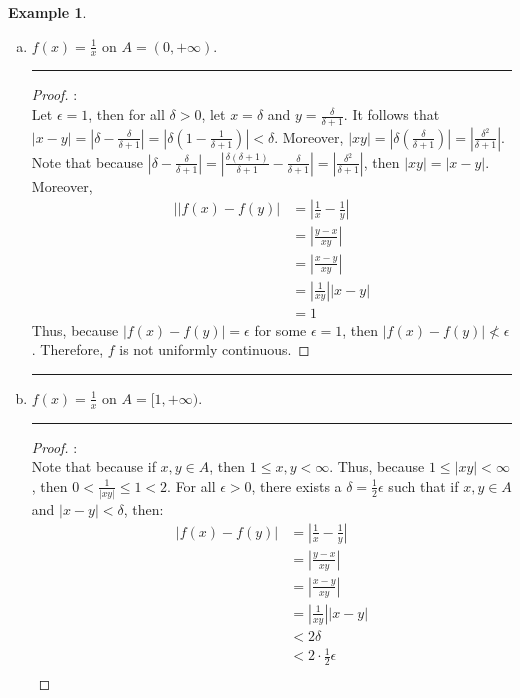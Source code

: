 \documentclass[openany, amssymb, psamsfonts]{amsart}
\theoremstyle{definition}
\newtheorem{exmp}{Example}[section]
\numberwithin{equation}{section}
\begin{document}
\begin{exmp}
\begin{enumerate}[(a)]
		\item $f(x) = \frac{1}{x}$ on $A = (0, + \infty)$.
\vspace{4pt}     \hrule   \vspace{4pt} \begin{proof}:\\
Let $\epsilon=1$, then for all $\delta >0$, let $x = \delta$ and $y = \frac{\delta}{\delta+1}$. It follows that $|x-y| = |\delta - \frac{\delta}{\delta+1}| = |\delta(1-\frac{1}{\delta+1})|<\delta$. Moreover, $|xy| = |\delta(\frac{\delta}{\delta+1})| = |\frac{\delta^2}{\delta+1}|$. Note that because $|\delta-\frac{\delta}{\delta+1}| = |\frac{\delta(\delta+1)}{\delta+1} - \frac{\delta}{\delta+1}| = |\frac{\delta^2}{\delta +1}|$, then $|xy| = |x-y|$. Moreover,
\begin{align*}
||f(x) - f(y)| &= |\frac{1}{x} - \frac{1}{y}|\\
                & = |\frac{y-x}{xy}|\\
                &= |\frac{x-y}{xy}|\\
                &= |\frac{1}{xy}||x-y|\\
\tag{since $|xy| = |x-y|$}                &= 1
\end{align*}
Thus, because $|f(x) - f(y)| = \epsilon$ for some $\epsilon =1$, then $|f(x) - f(y)|\not < \epsilon$. Therefore, $f$ is not uniformly continuous. 
\end{proof} \vspace{4pt}     \hrule   \vspace{4pt}
		\item $f(x) = \frac{1}{x}$ on $A = [1, + \infty)$.
\vspace{4pt}     \hrule   \vspace{4pt} \begin{proof}:\\
Note that because if $x,y \in A$, then $1\leq x,y<\infty$. Thus, because $1\leq |xy|< \infty$, then $0<\frac{1}{|xy|}\leq 1<2$. For all $\epsilon>0$, there exists a $\delta = \frac{1}{2}\epsilon$ such that if $x,y\in A$ and $|x-y|<\delta$, then:
\begin{align*}
|f(x) - f(y)| &= |\frac{1}{x} - \frac{1}{y}|\\
            & = |\frac{y-x}{xy}|\\
            &= |\frac{x-y}{xy}|\\
            &= |\frac{1}{xy}||x-y|\\
            &< 2\delta\\
            &<2\cdot \frac{1}{2}\epsilon\\

\end{align*}
\end{proof}
\end{enumerate}
\end{exmp}
\end{document}
